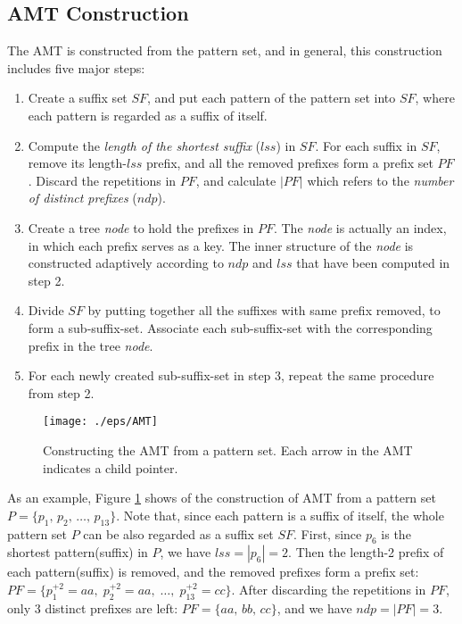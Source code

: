 \documentclass{article}
\begin{document}
\subsection{AMT Construction}
\label{subsec:amt}

The AMT is constructed from the pattern set, and in general, this
construction includes five major steps:

\begin{enumerate}
\item Create a suffix set $SF$, and put each pattern of the pattern
  set into $SF$, where each pattern is regarded as a suffix of itself.
\item Compute the \emph{length of the shortest suffix} ($lss$) in
  $SF$. For each suffix in $SF$, remove its length-$lss$ prefix, and
  all the removed prefixes form a prefix set $PF$. Discard the
  repetitions in $PF$, and calculate $|PF|$ which refers to the
  \emph{number of distinct prefixes} ($ndp$).
\item Create a tree \emph{node} to hold the prefixes in $PF$. The
  \emph{node} is actually an index, in which each prefix serves as a
  key. The inner structure of the \emph{node} is constructed
  adaptively according to $ndp$ and $lss$ that have been computed in
  step 2.
\item Divide $SF$ by putting together all the suffixes with same
  prefix removed, to form a sub-suffix-set. Associate each
  sub-suffix-set with the corresponding prefix in the tree
  \emph{node}.
\item For each newly created sub-suffix-set in step 3, repeat the same
  procedure from step 2.
\end{enumerate}

\begin{figure}[htbp]
  \centering
  \texttt{[image: ./eps/AMT]}
  \caption{Constructing the AMT from a pattern set. Each arrow
    in the AMT indicates a child pointer.}
  \label{fig:AMT}
\end{figure}

As an example, Figure \ref{fig:AMT} shows of the construction of AMT
from a pattern set $P = \{p_1,\, p_2,\, \dots,\, p_{13}\}$. Note that,
since each pattern is a suffix of itself, the whole pattern set $P$
can be also regarded as a suffix set $SF$. First, since $p_6$ is the
shortest pattern(suffix) in $P$, we have $lss = |p_6| = 2$. Then the
length-2 prefix of each pattern(suffix) is removed, and the removed
prefixes form a prefix set:
$PF = \{p_1^{+2} = aa,\; p_2^{+2} = aa,\; \dots,\; p_{13}^{+2} =
cc\}$. After discarding the repetitions in $PF$, only 3 distinct
prefixes are left: $PF = \{aa,\, bb,\, cc\}$, and we have
$ndp = |PF| = 3$.
\end{document}
